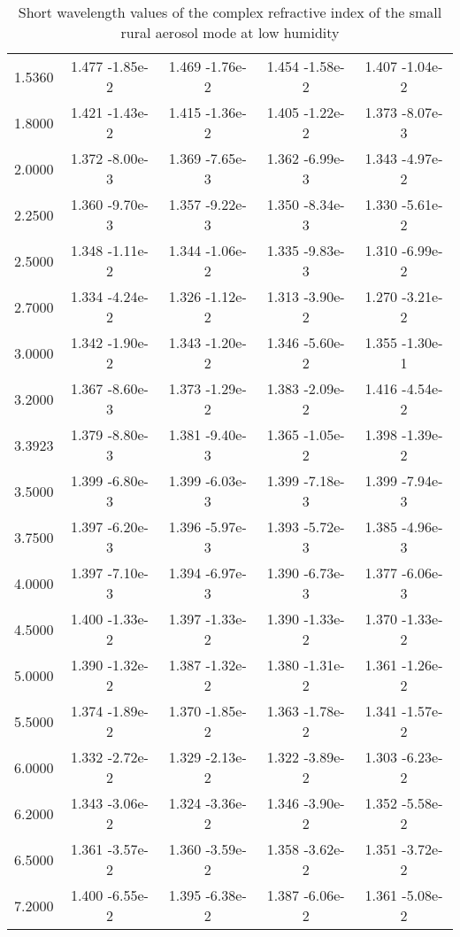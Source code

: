 \documentclass[12pt]{article}
\begin{document}
\begin{center}
\begin{table}
\begin{tabular}{| c | c | c | c | c |  }
1.5360  &  1.477 -1.85e-2  &  1.469 -1.76e-2  &  1.454 -1.58e-2  &  1.407 -1.04e-2 \\  
1.8000  &  1.421 -1.43e-2  &  1.415 -1.36e-2  &  1.405 -1.22e-2  &  1.373 -8.07e-3  \\ 
2.0000  &  1.372 -8.00e-3  &  1.369 -7.65e-3  &  1.362 -6.99e-3  &  1.343 -4.97e-2 \\  
2.2500 &  1.360 -9.70e-3   & 1.357 -9.22e-3   & 1.350 -8.34e-3  &  1.330 -5.61e-2  \\
2.5000  &  1.348 -1.11e-2  &  1.344 -1.06e-2  &  1.335 -9.83e-3  &  1.310 -6.99e-2 \\  
2.7000  &  1.334 -4.24e-2  &  1.326 -1.12e-2  &  1.313 -3.90e-2  &  1.270 -3.21e-2  \\ 
3.0000  &  1.342 -1.90e-2  &  1.343 -1.20e-2  &  1.346 -5.60e-2  &  1.355 -1.30e-1  \\ 
3.2000 &   1.367 -8.60e-3  &  1.373 -1.29e-2  &  1.383 -2.09e-2  &  1.416 -4.54e-2  \\
3.3923 &   1.379 -8.80e-3  &  1.381 -9.40e-3 &   1.365 -1.05e-2  &  1.398 -1.39e-2 \\ 
3.5000 &   1.399 -6.80e-3  &  1.399 -6.03e-3  &  1.399 -7.18e-3  &  1.399 -7.94e-3  \\ 
3.7500 &   1.397 -6.20e-3  &  1.396 -5.97e-3 &   1.393 -5.72e-3  &  1.385 -4.96e-3 \\  
4.0000 &   1.397 -7.10e-3  &  1.394 -6.97e-3 &   1.390 -6.73e-3  &  1.377 -6.06e-3  \\
4.5000 &   1.400 -1.33e-2  &  1.397 -1.33e-2 &   1.390 -1.33e-2  &  1.370 -1.33e-2  \\ 
5.0000 &   1.390 -1.32e-2  &  1.387 -1.32e-2  &  1.380 -1.31e-2  &  1.361 -1.26e-2  \\ 
5.5000 &   1.374 -1.89e-2  &  1.370 -1.85e-2  &  1.363 -1.78e-2  &  1.341 -1.57e-2  \\ 
6.0000 &   1.332 -2.72e-2  &  1.329 -2.13e-2 &   1.322 -3.89e-2 &   1.303 -6.23e-2  \\ 
6.2000 &   1.343 -3.06e-2 &   1.324 -3.36e-2 &   1.346 -3.90e-2  &  1.352 -5.58e-2  \\ 
6.5000 &   1.361 -3.57e-2 &   1.360 -3.59e-2 &   1.358 -3.62e-2  &  1.351 -3.72e-2 \\  
7.2000 &   1.400 -6.55e-2 &   1.395 -6.38e-2 &   1.387 -6.06e-2  &  1.361 -5.08e-2 \\ 
\hline
\end{tabular}
\caption{Short wavelength values of the complex refractive index of the small rural aerosol mode at low humidity}
\end{table}
\end{center}
\end{document}
